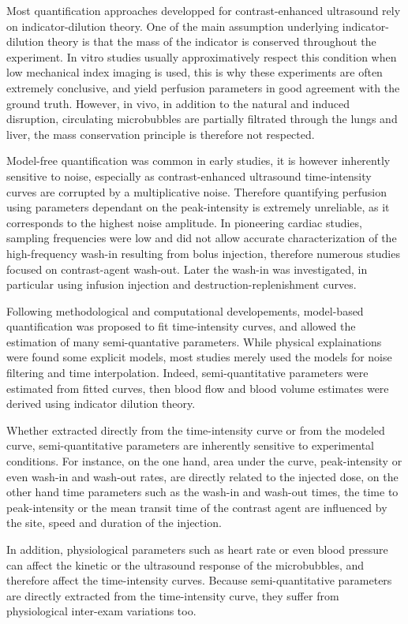 Most quantification approaches developped for contrast-enhanced ultrasound rely on indicator-dilution theory.
One of the main assumption underlying indicator-dilution theory is that the mass of the indicator is conserved throughout the experiment.
In vitro studies usually approximatively respect this condition when low mechanical index imaging is used, this is why these experiments are often extremely conclusive, and yield perfusion parameters in good agreement with the ground truth. 
However, in vivo, in addition to the natural and induced disruption, circulating microbubbles are partially filtrated through the lungs and liver, the mass conservation principle is therefore not respected.

Model-free quantification was common in early studies, it is however inherently sensitive to noise, especially as contrast-enhanced ultrasound time-intensity curves are corrupted by a multiplicative noise.
Therefore quantifying perfusion using parameters dependant on the peak-intensity is extremely unreliable, as it corresponds to the highest noise amplitude.
In pioneering cardiac studies, sampling frequencies were low and did not allow accurate characterization of the high-frequency wash-in resulting from bolus injection, therefore numerous studies focused on contrast-agent wash-out.
Later the wash-in was investigated, in particular using infusion injection and destruction-replenishment curves.

Following methodological and computational developements, model-based quantification was proposed to fit time-intensity curves, and allowed the estimation of many semi-quantative parameters. 
While physical explainations were found some explicit models, most studies merely used the models for noise filtering and time interpolation.
Indeed, semi-quantitative parameters were estimated from fitted curves, then blood flow and blood volume estimates were derived using indicator dilution theory.

Whether extracted directly from the time-intensity curve or from the modeled curve, semi-quantitative parameters are inherently sensitive to experimental conditions.
For instance, on the one hand, area under the curve, peak-intensity or even wash-in and wash-out rates, are directly related to the injected dose, on the other hand time parameters such as the wash-in and wash-out times, the time to peak-intensity or the mean transit time of the contrast agent are influenced by the site, speed and duration of the injection.

In addition, physiological parameters such as heart rate or even blood pressure can affect the kinetic or the ultrasound response of the microbubbles, and therefore affect the time-intensity curves. 
Because semi-quantitative parameters are directly extracted from the time-intensity curve, they suffer from physiological inter-exam variations too.

